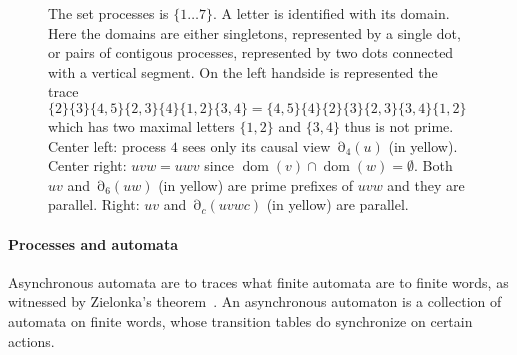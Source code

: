 \documentclass[a4paper,UKenglish]{lipics-v2016}
\DeclareMathOperator{\dom}{dom}
\DeclareMathOperator{\view}{\partial}
\begin{document}
\begin{figure}


\caption{\label{fig:example}
The set processes is $\{1\ldots 7\}$.
A letter is identified with its domain.
Here the domains are either singletons, represented by a single dot,
or pairs of contigous processes,
represented by two dots connected with a vertical segment.
On the left handside is represented the trace
$
\{2\}\{3\}\{4,5\}\{2,3\}\{4\}\{1,2\}\{3,4\}
=
\{4,5\}\{4\}\{2\}\{3\}\{2,3\}\{3,4\}\{1,2\}
$
which has two maximal letters $\{1,2\}$ and $\{3,4\}$ thus is not prime.
Center left: process $4$ sees only its causal view $\view_4(u)$ (in yellow).
Center right: $uvw=uwv$ since $\dom(v)\cap \dom(w)=\emptyset$. Both $uv$ and $\view_{6}(uw)$ (in yellow) are prime prefixes of $uvw$ and they are parallel.
Right: $uv$ and $\view_{c}(uvwc)$ (in yellow) are parallel.
}
\end{figure}

\paragraph*{Processes and automata}



Asynchronous automata are to traces what finite automata are to finite words, as witnessed by Zielonka's theorem~\cite{zautomata}. An asynchronous automaton is a collection of automata on finite words, whose transition tables do synchronize on certain actions. 
\end{document}
